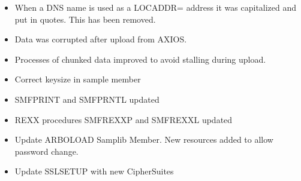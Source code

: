 \documentclass[letterpaper,10pt,english]{sphinxmanual}
\begin{document}
\sphinxAtStartPar
{}
\begin{itemize}
\item {} 
\sphinxAtStartPar
When a DNS name is used as a LOCADDR= address it was capitalized and put in quotes. This has been removed.

\end{itemize}

\sphinxAtStartPar
{}
\begin{itemize}
\item {} 
\sphinxAtStartPar
Data was corrupted after upload from AXIOS.

\end{itemize}

\sphinxAtStartPar
{}
\begin{itemize}
\item {} 
\sphinxAtStartPar
Processes of chunked data improved to avoid stalling during upload.

\end{itemize}

\sphinxAtStartPar
{}
\begin{itemize}
\item {} 
\sphinxAtStartPar
Correct keysize in sample member

\end{itemize}

\sphinxAtStartPar
{}
\begin{itemize}
\item {} 
\sphinxAtStartPar
SMFPRINT and SMFPRNTL updated

\item {} 
\sphinxAtStartPar
REXX procedures SMFREXXP and SMFREXXL updated

\end{itemize}

\sphinxAtStartPar
{}
\begin{itemize}
\item {} 
\sphinxAtStartPar
Update ARBOLOAD Samplib Member. New resources added to allow password change.

\end{itemize}

\sphinxAtStartPar
{}
\begin{itemize}
\item {} 
\sphinxAtStartPar
Update SSLSETUP with new CipherSuites

\end{itemize}
\end{document}
